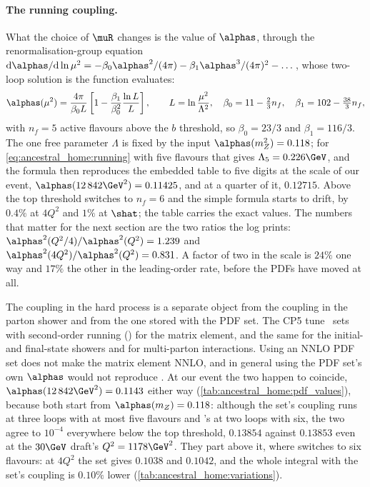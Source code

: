 \paragraph{The running coupling.} What the choice of $\muR$ changes is the
value of $\alphas$, through the renormalisation-group equation
$\mathrm{d}\alphas/\mathrm{d}\ln\mu^2=-\beta_0\alphas^2/(4\pi)-\beta_1\alphas^3/(4\pi)^2-\dots$,
whose two-loop solution is the function \PYTHIA evaluates:
\begin{equation}
  \alphas(\mu^2)=\frac{4\pi}{\beta_0L}\left[1-\frac{\beta_1}{\beta_0^2}\frac{\ln L}{L}\right],
  \qquad L=\ln\frac{\mu^2}{\Lambda^2},\quad
  \beta_0=11-\tfrac23n_f,\quad \beta_1=102-\tfrac{38}{3}n_f ,
  \label{eq:ancestral_home:running}
\end{equation}
with $n_f=5$ active flavours above the $b$ threshold, so $\beta_0=23/3$ and
$\beta_1=116/3$. The one free parameter $\Lambda$ is fixed by the input
$\alphas(m_Z^2)=0.118$; for \cref{eq:ancestral_home:running} with five
flavours that gives $\Lambda_5=0.226\GeV$, and the formula then reproduces
the embedded table to five digits at the scale of our event,
$\alphas(12\,842\GeV^2)=0.11425$, and at a quarter of it, $0.12715$. Above
the top threshold \PYTHIA switches to $n_f=6$ and the simple formula starts
to drift, by $0.4\%$ at $4Q^2$ and $1\%$ at $\shat$; the table carries the
exact values. The numbers that matter for the next section are the two
ratios the log prints: $\alphas^2(Q^2/4)/\alphas^2(Q^2)=1.239$ and
$\alphas^2(4Q^2)/\alphas^2(Q^2)=0.831$. A factor of two in the scale is
$24\%$ one way and $17\%$ the other in the leading-order rate, before the
PDFs have moved at all.

The coupling in the hard process is a separate object from the coupling in
the parton shower and from the one stored with the PDF set. The CP5
tune~\cite{CMS:2019csb} sets  with
second-order running () for the matrix element, and the
same for the initial- and final-state showers and for multi-parton
interactions. Using an NNLO PDF set does not make the matrix element NNLO,
and in general using the PDF set's own $\alphas$ would not reproduce
\PYTHIA. At our event the two happen to coincide,
$\alphas(12\,842\GeV^2)=0.1143$ either way
(\cref{tab:ancestral_home:pdf_values}), because both start from $\alphas(m_Z)=0.118$: although the set's coupling runs at three loops with at most five flavours and \PYTHIA's at two loops with six, the two agree to $10^{-4}$ everywhere below the top threshold, $0.13854$ against $0.13853$ even at the $30\GeV$ draft's $Q^2=1178\GeV^2$. They part above it, where \PYTHIA switches to six flavours: at $4Q^2$ the set gives $0.1038$ and \PYTHIA $0.1042$, and the whole integral with the set's coupling is $0.10\%$ lower (\cref{tab:ancestral_home:variations}).

